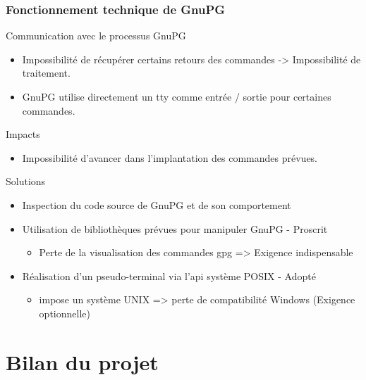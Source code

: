     \begin{frame}
      \frametitle{\color{white}Fonctionnement technique de GnuPG}
      \begin{block}{Communication avec le processus GnuPG}
        \begin{itemize}
	  \item Impossibilité de récupérer certains retours des commandes -> Impossibilité de traitement.
          \item GnuPG utilise directement un tty comme entrée / sortie pour certaines commandes.
        \end{itemize}
      \end{block}
       
      \begin{alertblock}{Impacts}
        \begin{itemize}
          \item Impossibilité d'avancer dans l'implantation des commandes prévues.
        \end{itemize}
      \end{alertblock}
        
      \begin{exampleblock}{Solutions}
        \begin{itemize}
          \item Inspection du code source de GnuPG et de son comportement
          \item Utilisation de bibliothèques prévues pour manipuler GnuPG - {\color{red}Proscrit}
	    \begin{itemize}
	     \item Perte de la visualisation des commandes gpg => Exigence indispensable
	    \end{itemize}
          \item Réalisation d'un pseudo-terminal via l'api système POSIX - {\color{green}Adopté}
	    \begin{itemize}
	     \item impose un système UNIX => perte de compatibilité Windows (Exigence optionnelle)
	    \end{itemize}
        \end{itemize}
      \end{exampleblock}
    \end{frame}

\section{Bilan du projet}
  
